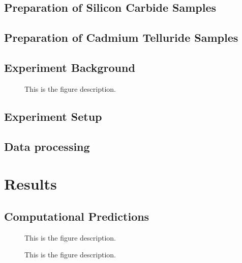 \documentclass[oneside, astronomy, noacknowlegments]{BYUPhys}
\begin{document}
\section{Preparation of Silicon Carbide Samples}
\label{sec:SiCSamples}

\section{Preparation of Cadmium Telluride Samples}

\section{Experiment Background}

\begin{figure}
    \caption[SiC energy levels and zero-field splitting]{\label{fig:SiCZeeman}
     This is the figure description.}
 \end{figure}

\section{Experiment Setup}
\label{sec:Experiment}

\section{Data processing}










\chapter{Results}

\section{Computational Predictions}

\begin{figure}
    \caption[ODMR computational model for SiC]{\label{fig:SiCModel}
     This is the figure description.}
 \end{figure}

\begin{figure}
    \caption[ODMR computational model for CdTe]{\label{fig:CdTeModel}
     This is the figure description.}
 \end{figure}
\end{document}
